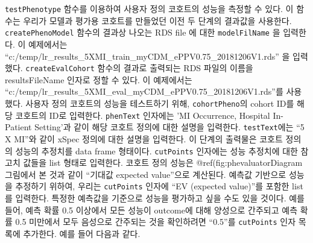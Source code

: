 \documentclass[10.5pt]{book}
\theoremstyle{definition}
\theoremstyle{definition}
\theoremstyle{definition}
\theoremstyle{remark}
\begin{document}
\texttt{testPhenotype} 함수를 이용하여 사용자 정의 코호트의 성능을
측정할 수 있다. 이 함수는 우리가 모델과 평가용 코호트를 만들었던 이전 두
단계의 결과값을 사용한다. \texttt{createPhenoModel} 함수의 결과상 나오는
RDS file 에 대한 \texttt{modelFilName} 을 입력한다. 이 예제에서는
``c:/temp/lr\_results\_5XMI\_train\_myCDM\_ePPV0.75\_20181206V1.rds'' 을
입력했다. \texttt{createEvalCohort} 함수의 결과로 출력되는 RDS 파일의
이름을 resultsFileName 인자로 정할 수 있다. 이 예제에서는
``c:/temp/lr\_results\_5XMI\_eval\_myCDM\_ePPV0.75\_20181206V1.rds''를
사용했다. 사용자 정의 코호트의 성능을 테스트하기 위해,
\texttt{cohortPheno}의 cohort ID를 해당 코호트의 ID로 입력한다.
\texttt{phenText} 인자에는 'MI Occurrence, Hospital In-Patient
Setting'과 같이 해당 코호트 정의에 대한 설명을 입력한다.
\texttt{testText}에는 ``5 X MI''와 같이 xSpec 정의에 대한 설명을
입력한다. 이 단계의 출력물은 코호트 정의의 성능의 추정치를 data frame
형태이다. \texttt{cutPoints} 인자에는 성능 추정치에 대한 참고치 값들을
list 형태로 입력한다. 코호트 정의 성능은 @ref(fig:phevaluatorDiagram
그림에서 본 것과 같이 ``기대값 expected value''으로 계산된다. 예측값
기반으로 성능을 추정하기 위하여, 우리는 \texttt{cutPoints} 인자에 ``EV
(expected value)''를 포함한 list를 입력한다. 특정한 예측값을 기준으로
성능을 평가하고 싶을 수도 있을 것이다. 예를 들어, 예측 확률 0.5 이상에서
모든 성능이 outcome에 대해 양성으로 간주되고 예측 확률 0.5 미만에서 모두
음성으로 간주되는 것을 확인하려면 ``0.5''를 \texttt{cutPoints} 인자
목록에 추가한다. 예를 들어 다음과 같다.
\end{document}
